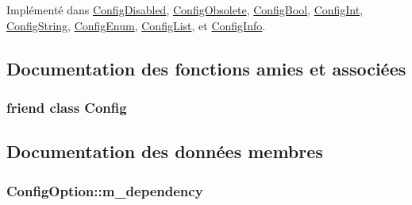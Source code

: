 Implémenté dans \hyperlink{class_config_disabled_a5319ee3a5cab4a4e46f3f860b4a7cdcd}{Config\+Disabled}, \hyperlink{class_config_obsolete_a00e20cabc9f351c44d6a76c924903356}{Config\+Obsolete}, \hyperlink{class_config_bool_aab61095cad30bfb2e184eb389d4d4472}{Config\+Bool}, \hyperlink{class_config_int_a2194c67246255b4106f70604c3bfb48d}{Config\+Int}, \hyperlink{class_config_string_a9ba817d1e46850c6000fe2dd6d03ff8e}{Config\+String}, \hyperlink{class_config_enum_aa739cce5633d2e75298bef0f6cf7c84c}{Config\+Enum}, \hyperlink{class_config_list_abd14c6ac16fd90f2e501ab10bb61344f}{Config\+List}, et \hyperlink{class_config_info_a8effa474d1ed0481ad0bdd506cffcc63}{Config\+Info}.



\subsection{Documentation des fonctions amies et associées}
\hypertarget{class_config_option_ac3da7e21a05bf8852638db7e4dd1b81a}{}
\subsubsection[{Config}]{\setlength{\rightskip}{0pt plus 5cm}friend class {\bf Config}\hspace{0.3cm}{\ttfamily [friend]}}\label{class_config_option_ac3da7e21a05bf8852638db7e4dd1b81a}


\subsection{Documentation des données membres}
\hypertarget{class_config_option_a5146ef81dc662e3c5b2f1e9d1f3c600e}{}
\subsubsection[{m\+\_\+dependency}]{ Config\+Option\+::m\+\_\+dependency\hspace{0.3cm}{\ttfamily [protected]}}\label{class_config_option_a5146ef81dc662e3c5b2f1e9d1f3c600e}
\hypertarget{class_config_option_a28fdea8e9fdf86e73faae697454c17ab}{}
